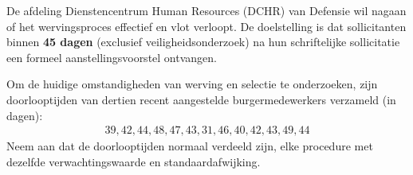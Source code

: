 \begin{question}{30}{
    De afdeling Dienstencentrum Human Resources (DCHR) van Defensie wil nagaan of het wervingsproces effectief en vlot verloopt.
    De doelstelling is dat sollicitanten binnen \textbf{45 dagen} (exclusief veiligheidsonderzoek) na hun schriftelijke sollicitatie een formeel aanstellingsvoorstel ontvangen.
    
    Om de huidige omstandigheden van werving en selectie te onderzoeken, zijn doorlooptijden van dertien recent aangestelde burgermedewerkers verzameld (in dagen):
    \begin{align*}
        39, 42, 44, 48, 47, 43, 31, 46, 40, 42, 43, 49, 44
    \end{align*}
    Neem aan dat de doorlooptijden normaal verdeeld zijn, elke procedure met dezelfde verwachtingswaarde en standaardafwijking.
}


\end{question}
